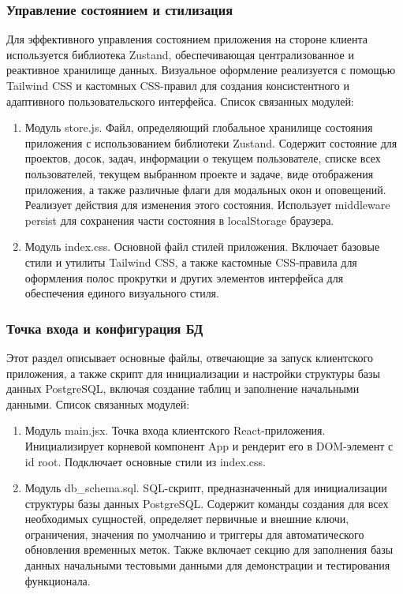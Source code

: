 \subsubsection{Управление состоянием и стилизация}
Для эффективного управления состоянием приложения на стороне клиента используется библиотека Zustand, обеспечивающая централизованное и реактивное хранилище данных. Визуальное оформление реализуется с помощью Tailwind CSS и кастомных CSS-правил для создания консистентного и адаптивного пользовательского интерфейса. Список связанных модулей:
\begin{enumerate}
	\item Модуль store.js. Файл, определяющий глобальное хранилище состояния приложения с использованием библиотеки Zustand. Содержит состояние для проектов, досок, задач, информации о текущем пользователе, списке всех пользователей, текущем выбранном проекте и задаче, виде отображения приложения, а также различные флаги для модальных окон и оповещений. Реализует действия для изменения этого состояния. Использует middleware persist для сохранения части состояния в localStorage браузера.
	\item Модуль index.css. Основной файл стилей приложения. Включает базовые стили и утилиты Tailwind CSS, а также кастомные CSS-правила для оформления полос прокрутки и других элементов интерфейса для обеспечения единого визуального стиля.
\end{enumerate}

\subsubsection{Точка входа и конфигурация БД}
Этот раздел описывает основные файлы, отвечающие за запуск клиентского приложения, а также скрипт для инициализации и настройки структуры базы данных PostgreSQL, включая создание таблиц и заполнение начальными данными. Список связанных модулей:
\begin{enumerate}
	\item Модуль main.jsx. Точка входа клиентского React-приложения. Инициализирует корневой компонент App и рендерит его в DOM-элемент с id root. Подключает основные стили из index.css.
	\item Модуль db\_schema.sql. SQL-скрипт, предназначенный для инициализации структуры базы данных PostgreSQL. Содержит команды создания для всех необходимых сущностей, определяет первичные и внешние ключи, ограничения, значения по умолчанию и триггеры для автоматического обновления временных меток. Также включает секцию для заполнения базы данных начальными тестовыми данными для демонстрации и тестирования функционала.
\end{enumerate}

